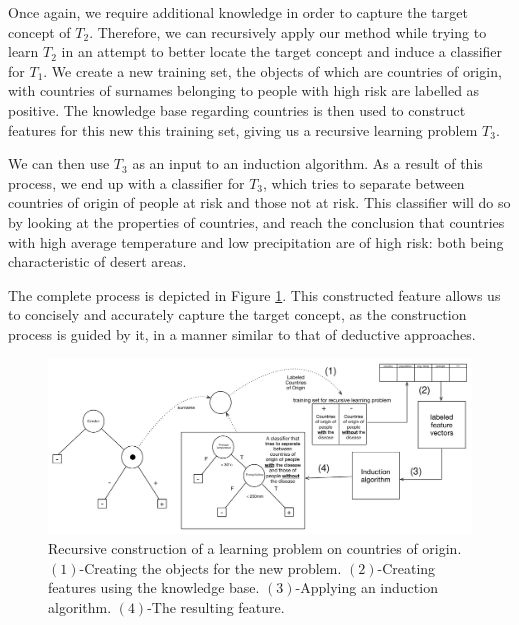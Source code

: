 \documentclass{article}
\theoremstyle{definition}
\begin{document}
Once again, we require additional knowledge in order to capture the target concept of $T_2$. 
Therefore, we can recursively apply our method while trying to learn $T_2$ in an attempt to better locate the target concept and induce a classifier for $T_1$.
We create a new training set, the objects of which are countries of origin, with countries of surnames belonging to people with high risk are labelled as positive. The knowledge base regarding countries is then used to construct features for this new this training set, giving us a recursive learning problem $T_3$.

We can then use $T_3$ as an input to an induction algorithm. As a result of this process, we end up with a classifier for $T_3$, which tries to separate between countries of origin of people at risk and those not at risk. This classifier will do so by looking at the properties of countries, and reach the conclusion that countries with high average temperature and low precipitation are of high risk: both being characteristic of desert areas.

The complete process is depicted in Figure \ref{fig:moving_to_lvl2}. %
This constructed feature allows us to concisely and accurately capture the target concept, as the construction process is guided by it, in a manner similar to that of deductive approaches.


\begin{figure}[th]
	\centering
	\includegraphics[width=0.9\linewidth,height=0.33\linewidth]{fig4_annotated.pdf}
	\caption{Recursive construction of a learning problem on countries of origin. $(1)$-Creating the objects for the new problem. $(2)$-Creating features using the knowledge base. $(3)$-Applying an induction algorithm. $(4)$-The resulting feature.}
	\label{fig:moving_to_lvl2}
\end{figure}
\end{document}
